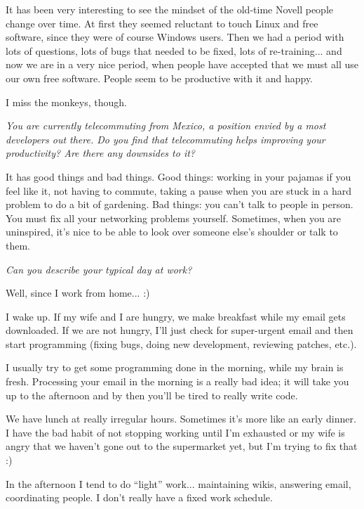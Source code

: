 \documentclass{memoir}
\begin{document}
It has been very interesting to see the mindset of the old-time Novell
people change over time. At first they seemed reluctant to touch Linux
and free software, since they were of course Windows users. Then we
had a period with lots of questions, lots of bugs that needed to be
fixed, lots of re-training... and now we are in a very nice period,
when people have accepted that we must all use our own free
software. People seem to be productive with it and happy.

I miss the monkeys, though.

\bigskip

\emph{You are currently telecommuting from Mexico, a position envied by a
most developers out there. Do you find that telecommuting helps
improving your productivity? Are there any downsides to it?}

\bigskip

It has good things and bad things. Good things: working in your
pajamas if you feel like it, not having to commute, taking a pause
when you are stuck in a hard problem to do a bit of gardening. Bad
things: you can't talk to people in person. You must fix all your
networking problems yourself. Sometimes, when you are uninspired, it's
nice to be able to look over someone else's shoulder or talk to them.

\bigskip

\emph{Can you describe your typical day at work?}

\bigskip

Well, since I work from home... :)

I wake up. If my wife and I are hungry, we make breakfast while my
email gets downloaded. If we are not hungry, I'll just check for
super-urgent email and then start programming (fixing bugs, doing new
development, reviewing patches, etc.).

I usually try to get some programming done in the morning, while my
brain is fresh. Processing your email in the morning is a really bad
idea; it will take you up to the afternoon and by then you'll be tired
to really write code.

We have lunch at really irregular hours. Sometimes it's more like an
early dinner. I have the bad habit of not stopping working until I'm
exhausted or my wife is angry that we haven't gone out to the
supermarket yet, but I'm trying to fix that :)

In the afternoon I tend to do ``light'' work... maintaining wikis,
answering email, coordinating people. I don't really have a fixed work
schedule.
\end{document}
